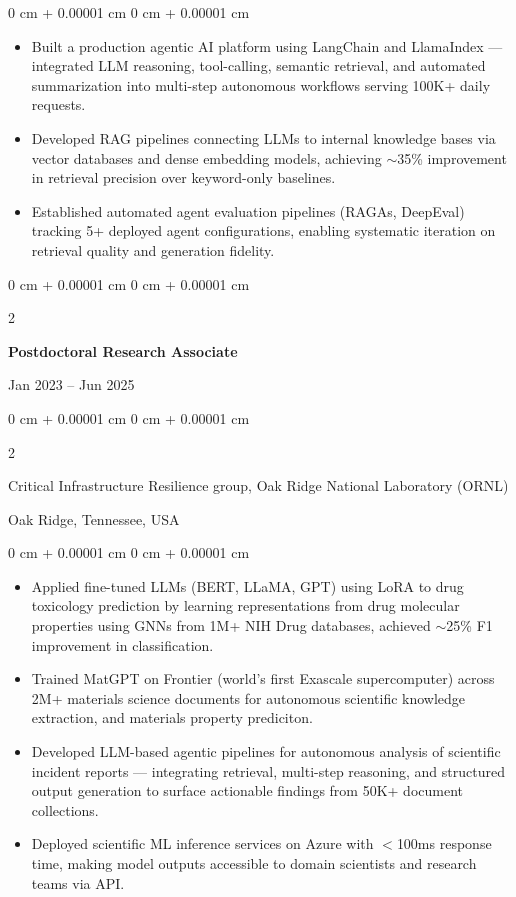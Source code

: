 \documentclass[10pt, letterpaper]{article}
\newenvironment{highlights}{
    \begin{itemize}[
        topsep=0.10 cm,
        parsep=0.10 cm,
        partopsep=0pt,
        itemsep=0pt,
        leftmargin=0 cm + 10pt
    ]
}{
    \end{itemize}
} %
\newenvironment{onecolentry}{
    \begin{adjustwidth}{
        0 cm + 0.00001 cm
    }{
        0 cm + 0.00001 cm
    }
}{
    \end{adjustwidth}
} %
\newenvironment{twocolentry}[2][]{
    \onecolentry
    \def\secondColumn{#2}
    \setcolumnwidth{\fill, 4.5 cm}
    \begin{paracol}{2}
}{
    \switchcolumn \raggedleft \secondColumn
    \end{paracol}
    \endonecolentry
} %
\begin{document}
    \begin{onecolentry}
        \begin{highlights}
            \item Built a production agentic AI platform using LangChain and LlamaIndex — integrated LLM reasoning, tool-calling, semantic retrieval, and automated summarization into multi-step autonomous workflows serving 100K+ daily requests.
            \item Developed RAG pipelines connecting LLMs to internal knowledge bases via vector databases and dense embedding models, achieving $\sim$35\% improvement in retrieval precision over keyword-only baselines.
            \item Established automated agent evaluation pipelines (RAGAs, DeepEval) tracking 5+ deployed agent configurations, enabling systematic iteration on retrieval quality and generation fidelity.
        \end{highlights}
    \end{onecolentry}

\vspace{1mm}

    \begin{twocolentry}{Jan 2023 -- Jun 2025}
        \textbf{Postdoctoral Research Associate}
    \end{twocolentry}
    \begin{twocolentry}{Oak Ridge, Tennessee, USA}
        Critical Infrastructure Resilience group, Oak Ridge National Laboratory (ORNL)
    \end{twocolentry}
    \vspace{0.10 cm}
    \begin{onecolentry}
        \begin{highlights}
            \item Applied fine-tuned LLMs (BERT, LLaMA, GPT) using LoRA to drug toxicology prediction by learning representations from drug molecular properties using GNNs from 1M+ NIH Drug databases, achieved $\sim$25\% F1 improvement in classification.
            \item Trained MatGPT on Frontier (world’s first Exascale supercomputer) across 2M+ materials science documents for autonomous scientific knowledge extraction, and materials property prediciton.
            \item Developed LLM-based agentic pipelines for autonomous analysis of scientific incident reports — integrating retrieval, multi-step reasoning, and structured output generation to surface actionable findings from 50K+ document collections.
            \item Deployed scientific ML inference services on Azure with $<$100ms response time, making model outputs accessible to domain scientists and research teams via API.
        \end{highlights}
    \end{onecolentry}
\end{document}

